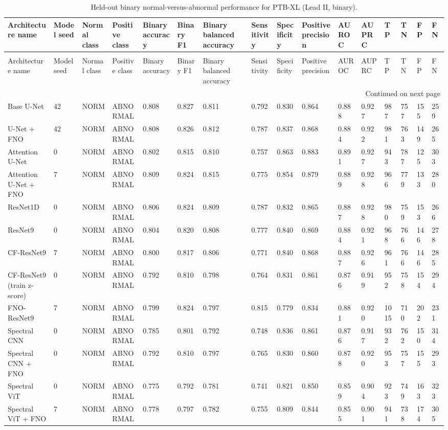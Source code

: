 \begin{longtable}{llllllllllllllll}
\caption{Held-out binary normal-versus-abnormal performance for PTB-XL (Lead II, binary).} \label{tab:ptbxl_leadii_binary_binary_normal_abnormal} \\
\toprule
Architecture name & Model seed & Normal class & Positive class & Binary accuracy & Binary F1 & Binary balanced accuracy & Sensitivity & Specificity & Positive precision & AUROC & AUPRC & TP & TN & FP & FN \\
\midrule
\endfirsthead
\caption[]{Held-out binary normal-versus-abnormal performance for PTB-XL (Lead II, binary).} \\
\toprule
Architecture name & Model seed & Normal class & Positive class & Binary accuracy & Binary F1 & Binary balanced accuracy & Sensitivity & Specificity & Positive precision & AUROC & AUPRC & TP & TN & FP & FN \\
\midrule
\endhead
\midrule
\multicolumn{16}{r}{Continued on next page} \\
\midrule
\endfoot
\bottomrule
\endlastfoot
Base U-Net & 42 & NORM & ABNORMAL & 0.808 & 0.827 & 0.811 & 0.792 & 0.830 & 0.864 & 0.888 & 0.927 & 987 & 757 & 155 & 259 \\
U-Net + FNO & 42 & NORM & ABNORMAL & 0.808 & 0.826 & 0.812 & 0.787 & 0.837 & 0.868 & 0.884 & 0.922 & 981 & 763 & 149 & 265 \\
Attention U-Net & 0 & NORM & ABNORMAL & 0.802 & 0.815 & 0.810 & 0.757 & 0.863 & 0.883 & 0.891 & 0.927 & 943 & 787 & 125 & 303 \\
Attention U-Net + FNO & 7 & NORM & ABNORMAL & 0.809 & 0.824 & 0.815 & 0.775 & 0.854 & 0.879 & 0.889 & 0.928 & 966 & 779 & 133 & 280 \\
ResNet1D & 0 & NORM & ABNORMAL & 0.806 & 0.824 & 0.809 & 0.787 & 0.832 & 0.865 & 0.887 & 0.928 & 980 & 759 & 153 & 266 \\
ResNet9 & 0 & NORM & ABNORMAL & 0.804 & 0.820 & 0.808 & 0.777 & 0.840 & 0.869 & 0.884 & 0.921 & 968 & 766 & 146 & 278 \\
CF-ResNet9 & 7 & NORM & ABNORMAL & 0.800 & 0.817 & 0.806 & 0.771 & 0.840 & 0.868 & 0.887 & 0.926 & 961 & 766 & 146 & 285 \\
CF-ResNet9 (train z-score) & 0 & NORM & ABNORMAL & 0.792 & 0.810 & 0.798 & 0.764 & 0.831 & 0.861 & 0.876 & 0.919 & 952 & 758 & 154 & 294 \\
FNO-ResNet9 & 7 & NORM & ABNORMAL & 0.799 & 0.824 & 0.797 & 0.815 & 0.779 & 0.834 & 0.881 & 0.920 & 1015 & 710 & 202 & 231 \\
Spectral CNN & 0 & NORM & ABNORMAL & 0.785 & 0.801 & 0.792 & 0.748 & 0.836 & 0.861 & 0.876 & 0.917 & 932 & 762 & 150 & 314 \\
Spectral CNN + FNO & 0 & NORM & ABNORMAL & 0.792 & 0.810 & 0.797 & 0.765 & 0.830 & 0.860 & 0.878 & 0.920 & 953 & 757 & 155 & 293 \\
Spectral ViT & 0 & NORM & ABNORMAL & 0.775 & 0.792 & 0.781 & 0.741 & 0.821 & 0.850 & 0.859 & 0.904 & 923 & 749 & 163 & 323 \\
Spectral ViT + FNO & 7 & NORM & ABNORMAL & 0.778 & 0.797 & 0.782 & 0.755 & 0.809 & 0.844 & 0.855 & 0.901 & 941 & 738 & 174 & 305 \\
\end{longtable}
